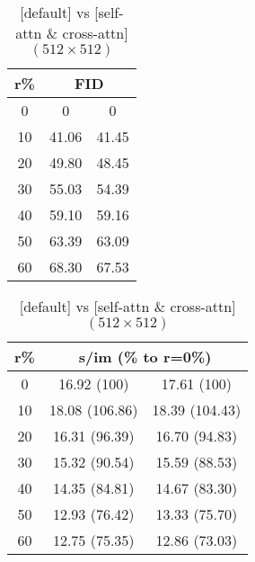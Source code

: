 \begin{table}[htp]
\caption{[default] vs [self-attn \& cross-attn] $(512 \times 512)$}
\label{table:exp_2}
    \begin{minipage}{0.48\textwidth}
        \centering
        \begin{tabular}{|c||c|c|}
            \hline
            \multicolumn{1}{|c||}{r\%} & \multicolumn{2}{c|}{FID}\\
            \hline
            0 & 0 & 0 \\
            10 & 41.06 & 41.45 \\
            20 & 49.80 & 48.45 \\
            30 & 55.03 & 54.39 \\
            40 & 59.10 & 59.16 \\
            50 & 63.39 & 63.09 \\
            60 & 68.30 & 67.53 \\
            \hline
        \end{tabular}
    \end{minipage}
    \hfill
    \begin{minipage}{0.48\textwidth}
        \centering
        \begin{tabular}{|c||c|c|}
            \hline
            \multicolumn{1}{|c||}{r\%} & \multicolumn{2}{c|}{s/im (\% to r=0\%)}\\
            \hline
            0 & 16.92 (100) & 17.61 (100) \\
            10 & 18.08 (106.86) & 18.39 (104.43) \\
            20 & 16.31 (96.39) & 16.70 (94.83) \\
            30 & 15.32 (90.54) & 15.59 (88.53) \\
            40 & 14.35 (84.81) & 14.67 (83.30) \\
            50 & 12.93 (76.42) & 13.33 (75.70) \\
            60 & 12.75 (75.35) & 12.86 (73.03) \\
            \hline
        \end{tabular}
    \end{minipage}
\end{table}